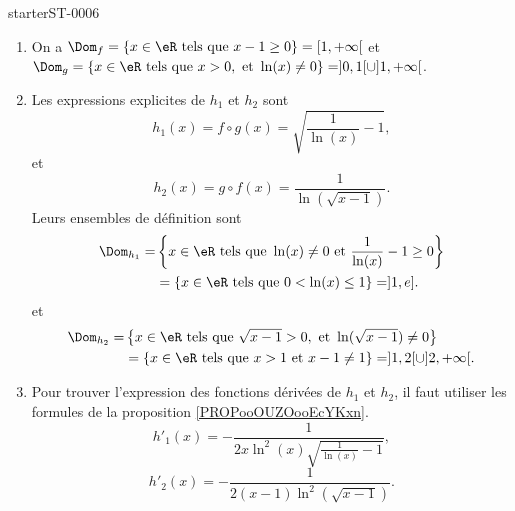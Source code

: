 
\begin{corrige}{starterST-0006}

\begin{enumerate}
\item On a $\Dom_f = \{x\in\eR \text{ tels que } x-1\geq 0\} = [1, +\infty[$ et  $\Dom_g = \{x\in\eR \text{ tels que } x> 0, \text{ et } \ln(x)\neq 0\} = ]0,1[\cup]1, +\infty[$.
\item Les expressions explicites de $h_1$ et $h_2$ sont 
\[
h_1 (x) = f\circ g (x) = \sqrt{\frac{1}{\ln(x)} -1},
\]
et 
\[
h_2(x)=g\circ f (x)=\frac{1}{\ln\left(\sqrt{x-1}\right)}.
\]
Leurs ensembles de définition sont 
\begin{equation*}  
  \begin{aligned}
    \Dom_{h_1} =& \left\{x\in\eR \text{ tels que }  \ln(x)\neq 0  \text{ et }\frac{1}{\ln(x)}-1\geq 0\right\}\\
    & = \left\{x\in\eR \text{ tels que } 0 <\ln(x)\leq 1\right\}  = ]1, e]. 
  \end{aligned}
\end{equation*}
et 
\begin{equation*}
  \begin{aligned}
    \Dom_{h_2} =& \left\{x\in\eR \text{ tels que }  \sqrt{x-1}> 0, \text{ et } \ln(\sqrt{x-1})\neq 0 \right\}\\
    & = \left\{x\in\eR \text{ tels que } x>1 \text{ et } x-1\neq 1\right\}  = ]1,2[\cup]2,+\infty[. 
  \end{aligned}
\end{equation*}
\item Pour trouver l'expression des fonctions dérivées de $h_1$ et $h_2$, il faut utiliser les formules de la proposition \ref{PROPooOUZOooEcYKxn}. 
  \begin{equation*}
    h'_1(x) = -\frac{1}{2x\ln^2(x)\sqrt{\frac{1}{\ln(x)} -1}},
  \end{equation*}
  \begin{equation*}
   h'_2(x) = -  \frac{1}{2(x-1)\ln^2(\sqrt{x-1})}.
  \end{equation*}
\end{enumerate}
   


\end{corrige}


